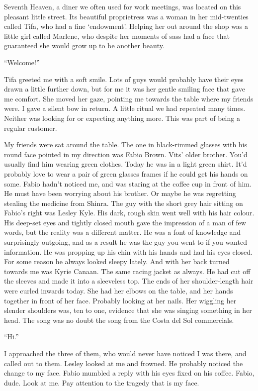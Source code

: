 \documentclass[oneside]{book}
\begin{document}
Seventh Heaven, a diner we often used for work meetings, was located on this pleasant little street. Its beautiful proprietress was a woman in her mid-twenties called Tifa, who had a fine ‘endowment’. Helping her out around the shop was a little girl called Marlene, who despite her moments of sass had a face that guaranteed she would grow up to be another beauty.

“Welcome!”

Tifa greeted me with a soft smile. Lots of guys would probably have their eyes drawn a little further down, but for me it was her gentle smiling face that gave me comfort. She moved her gaze, pointing me towards the table where my friends were. I gave a silent bow in return. A little ritual we had repeated many times. Neither was looking for or expecting anything more. This was part of being a regular customer.

My friends were sat around the table. The one in black-rimmed glasses with his round face pointed in my direction was Fabio Brown. Vits’ older brother. You’d usually find him wearing green clothes. Today he was in a light green shirt. It’d probably love to wear a pair of green glasses frames if he could get his hands on some. Fabio hadn’t noticed me, and was staring at the coffee cup in front of him. He must have been worrying about his brother. Or maybe he was regretting stealing the medicine from Shinra. The guy with the short grey hair sitting on Fabio’s right was Lesley Kyle. His dark, rough skin went well with his hair colour. His deep-set eyes and tightly closed mouth gave the impression of a man of few words, but the reality was a different matter. He was a font of knowledge and surprisingly outgoing, and as a result he was the guy you went to if you wanted information. He was propping up his chin with his hands and had his eyes closed. For some reason he always looked sleepy lately. And with her back turned towards me was Kyrie Canaan. The same racing jacket as always. He had cut off the sleeves and made it into a sleeveless top. The ends of her shoulder-length hair were curled inwards today. She had her elbows on the table, and her hands together in front of her face. Probably looking at her nails. Her wiggling her slender shoulders was, ten to one, evidence that she was singing something in her head. The song was no doubt the song from the Costa del Sol commercials.

“Hi.”

I approached the three of them, who would never have noticed I was there, and called out to them. Lesley looked at me and frowned. He probably noticed the change to my face. Fabio mumbled a reply with his eyes fixed on his coffee. Fabio, dude. Look at me. Pay attention to the tragedy that is my face.
\end{document}
